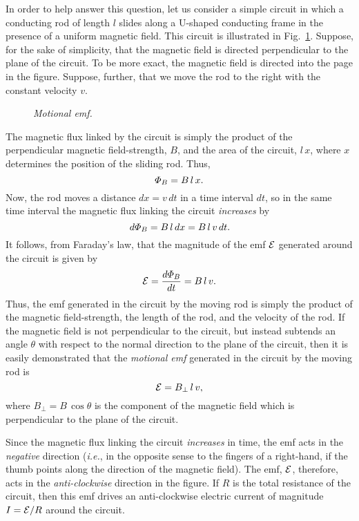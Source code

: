In order to help answer this question, let us consider a simple
circuit in which a conducting rod of length $l$ slides along a
U-shaped conducting frame in the presence of a uniform magnetic field.
This circuit is illustrated in Fig.~\ref{f9.3}. Suppose, for the sake of simplicity, that the
magnetic field is directed perpendicular to the plane of the circuit. To be
more exact, the magnetic field is directed into the page in the figure.
Suppose, further, that we move the rod to the right with the constant velocity
$v$. 

\begin{figure}
\epsfysize=3in
\centerline{}
\caption{\em Motional emf.}\label{f9.3}
\end{figure}

The magnetic flux linked by the circuit is simply the product of
the perpendicular magnetic field-strength, $B$, and the area of the circuit,
$l\,x$, where $x$ determines the position of the sliding rod.
Thus,
\begin{equation}
{\mit\Phi}_B = B\,l\,x.
\end{equation}
Now, the rod moves a distance $dx=v\,dt$ in a
time interval $dt$, so in the same time interval the magnetic
flux linking the circuit {\em increases}\/ by
\begin{equation}
d{\mit\Phi}_B = B\,l\,dx = B\,l\,v\,dt.
\end{equation}
It follows, from Faraday's law, that the magnitude of the emf ${\cal E}$
generated around the circuit is given by
\begin{equation}\label{e9.15}
{\cal E} = \frac{d{\mit\Phi}_B}{d t} = B\,l\,v.
\end{equation}
Thus, the emf generated in the circuit by the moving rod is simply the product of
the magnetic field-strength, the length of the rod, and the velocity of
the rod. 
If the magnetic field is not perpendicular to the circuit,
but instead subtends an angle $\theta$ with respect to the normal direction
to the plane of the circuit, then it is easily demonstrated that the 
{\em motional emf}\/ generated in the circuit by the moving rod is
\begin{equation}
{\cal E} = B_\perp\,l\,v,
\end{equation}
where $B_\perp = B\,\cos\theta$ is the component of the magnetic field 
which is perpendicular to  the plane of the circuit. 

Since the magnetic flux linking the circuit  {\em increases}\/ in time, the
emf acts in the {\em negative}\/ direction ({\em i.e.}, in the opposite sense to the
fingers of a right-hand, if the thumb  points along the
direction of the magnetic field). The emf, ${\cal E}$, therefore, acts in the
{\em anti-clockwise}\/ direction in the figure. If $R$
is the total  resistance of the circuit,
then this emf drives an anti-clockwise electric current of magnitude
$I={\cal E}/R$ around the circuit.

